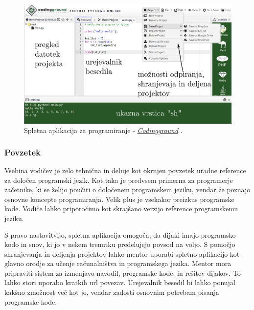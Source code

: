 \begin{figure}[h!]
  \centering
    \includegraphics [width=0.65\linewidth, keepaspectratio =
   1] {./images/sc_web/tutpoint_cg-v01.jpg}
   \caption{Spletna aplikacija za programiranje -
     \emph{\href{http://www.tutorialspoint.com/codingground.htm}{Codingground}}
     \cite{web:tutorialspoint:codingground}.}
    \label{fig:web:tutpoint:cg}
\end{figure}

\subsubsection{Povzetek}
\label{sec:povzetek_tutpoint}

Vsebina vodičev je zelo tehnična in deluje kot okrnjen povzetek uradne
reference za določen programski jezik. Kot taka je predvsem primerna
za programerje začetnike, ki se želijo poučiti o določenem programskem
jeziku, vendar že poznajo osnovne koncepte programiranja. Velik plus
je vsekakor preizkus programske kode. Vodiče lahko priporočimo kot
skrajšano verzijo reference programskemu jeziku.

S pravo nastavitvijo, spletna aplikacija omogoča, da dijaki imajo
programsko kodo in snov, ki jo v nekem trenutku predelujejo povsod na
voljo. S pomočjo shranjevanja in deljenja projektov lahko mentor
uporabi spletno aplikacijo kot glavno orodje za učenje računalništva
in programskega jezika. Mentor mora pripraviti sistem za izmenjavo
navodil, programske kode, in rešitev dijakov. To lahko stori uporabo
kratkih url povezav. Urejevalnik besedil bi lahko ponujal kakšno
zmožnost več kot jo, vendar zadosti osnovnim potrebam pisanja
programske kode.


